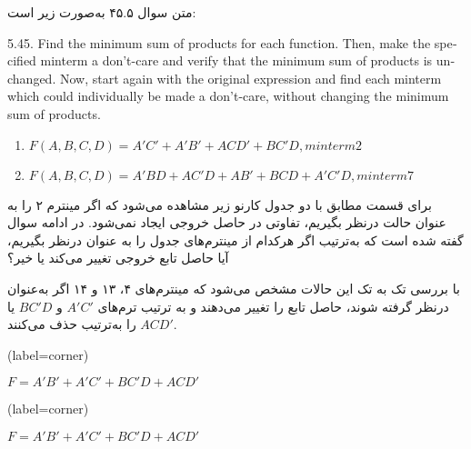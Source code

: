متن سوال ۴۵.۵ به‌صورت زیر است:

\begin{latin}
	5.45. Find the minimum sum of products for each function. Then, make the specified
	minterm a don’t-care and verify that the minimum sum of products is unchanged.
	Now, start again with the original expression and find each minterm which
	could individually be made a don’t-care, without changing the minimum sum of
	products.
	
	\begin{enumerate}
		\item 
		$F(A, B, C, D) = A'C' + A'B' + ACD' + BC'D, minterm 2$
		
		\item 
		$F(A, B, C, D) = A'BD + AC'D + AB' + BCD + A'C'D, minterm 7$
	\end{enumerate}
\end{latin}


برای قسمت  مطابق با دو جدول کارنو زیر مشاهده می‌شود که اگر مینترم ۲ را به عنوان حالت  درنظر بگیریم، تفاوتی در حاصل خروجی ایجاد نمی‌شود. در ادامه سوال گفته شده است که به‌ترتیب اگر هرکدام از مینترم‌های جدول را به عنوان  درنظر بگیریم، آیا حاصل تابع خروجی تغییر می‌کند یا خیر؟

با بررسی تک به تک این حالات مشخص می‌شود که مینترم‌های ۴، ۱۳ و ۱۴ اگر به‌عنوان  درنظر گرفته شوند، حاصل تابع را تغییر می‌دهند و به ترتیب ترم‌های $A'C'$ و $BC'D$ یا $ACD'$ را به‌ترتیب حذف می‌کنند.

\begin{latin}
	\begin{minipage}{0.48\textwidth}
		\centering
		\begin{karnaugh-map}[4][4][1][$B$][$A$][$C$][$D$](label=corner)
		\end{karnaugh-map}

		$F=A'B'+A'C'+BC'D+ACD'$
	\end{minipage}
	\hfill
	\begin{minipage}{0.48\textwidth}
		\centering
		\begin{karnaugh-map}[4][4][1][$B$][$A$][$D$][$C$](label=corner)
		\end{karnaugh-map}

		$F=A'B'+A'C'+BC'D+ACD'$
	\end{minipage}	
\end{latin}



